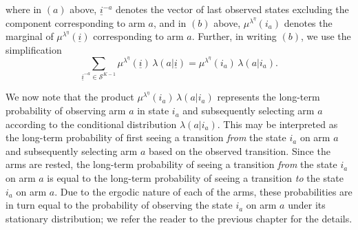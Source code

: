{\color{black} where in $(a)$ above, $\underline{i}^{-a}$ denotes the vector of last observed states excluding the component corresponding to arm $a$, and in $(b)$ above, $\mu^{\lambda^\eta}(i_a)$ denotes the marginal of $\mu^{\lambda^\eta}(\underline{i})$ corresponding to arm $a$. Further, in writing $(b)$, we use the simplification
\begin{equation}
\sum\limits_{\underline{i}^{-a}\in \mathcal{S}^{K-1}}\mu^{\lambda^\eta}(\underline{i})\,\lambda(a|\underline{i}) = \mu^{\lambda^\eta}(i_a)\,\lambda(a|i_a).
\end{equation}}

{\color{black} We now note that the product $\mu^{\lambda^\eta}(i_a)\,\lambda(a|i_a)$ represents the long-term probability of observing arm $a$ in state $i_a$ 
 and subsequently selecting arm $a$ according to the conditional distribution $\lambda(a|i_a)$. This may be interpreted as the long-term probability of first seeing a transition \emph{from} the state $i_a$ on arm $a$ and subsequently selecting arm $a$ based on the observed transition. Since the arms are rested, the long-term probability of seeing a transition \emph{from} the state $i_a$ on arm $a$ is equal to the long-term probability of seeing a transition \emph{to} the state $i_a$ on arm $a$. Due to the ergodic nature of each of the arms, these probabilities are in turn equal to the probability of observing the state $i_a$ on arm $a$ under its stationary distribution; we refer the reader to the previous chapter for the details.}

